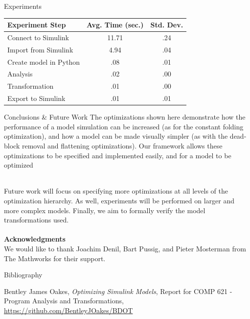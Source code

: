 \documentclass[final,hyperref={pdfpagelabels=false}]{beamer}
\begin{document}
\begin{frame}{}
\begin{columns}[t,totalwidth=\linewidth]
\begin{column}{.4\linewidth}
\begin{block}{Experiments}
\begin{table}[h]
\begin{tabular}{l | c c }
	          \textbf{Experiment Step} & \textbf{Avg. Time (sec.)} & \textbf{Std. Dev.} \\\hline
	           
	          Connect to Simulink & 11.71 & .24 \\
	          Import from Simulink & 4.94 & .04 \\
	          Create model in Python & .08 & .01 \\
	          Analysis & .02 & .00 \\
	          Transformation & .01 & .00 \\
	          Export to Simulink & .01 & .01 \\
	          
	          
	          \end{tabular}
	          
	          \end{table}
             \end{block}
             \vspace{-0.2cm}
             \begin{block}{Conclusions \& Future Work}
             \small
        	   The optimizations shown here demonstrate how the performance of a model simulation can be increased (as for the constant folding optimization), and how a model can be made visually simpler (as with the dead-block removal and flattening optimizations). Our framework allows these optimizations to be specified and implemented easily, and for a model to be optimized 
        	   
        	   ~\\
        	   Future work will focus on specifying more optimizations at all levels of the optimization hierarchy. As well, experiments will be performed on larger and more complex models. Finally, we aim to formally verify the model transformations used.\\~\\
        	   \footnotesize
        	   \textbf{Acknowledgments}\\
        	   We would like to thank Joachim Denil, Bart Pussig, and Pieter Mosterman from The Mathworks for their support.
             \end{block}
             \vspace{-0.2cm}
             \begin{block}{Bibliography}
             \small
     	   \begin{thebibliography}{10} 
     	    Bentley James Oakes, {\em Optimizing Simulink Models}, Report for COMP 621 - Program Analysis and Transformations, \url{https://github.com/BentleyJOakes/BDOT}
          		\end{thebibliography}	   
              	\end{block}
                     
                     
           \end{column}

    \end{columns}

  \end{frame}
\end{document}
